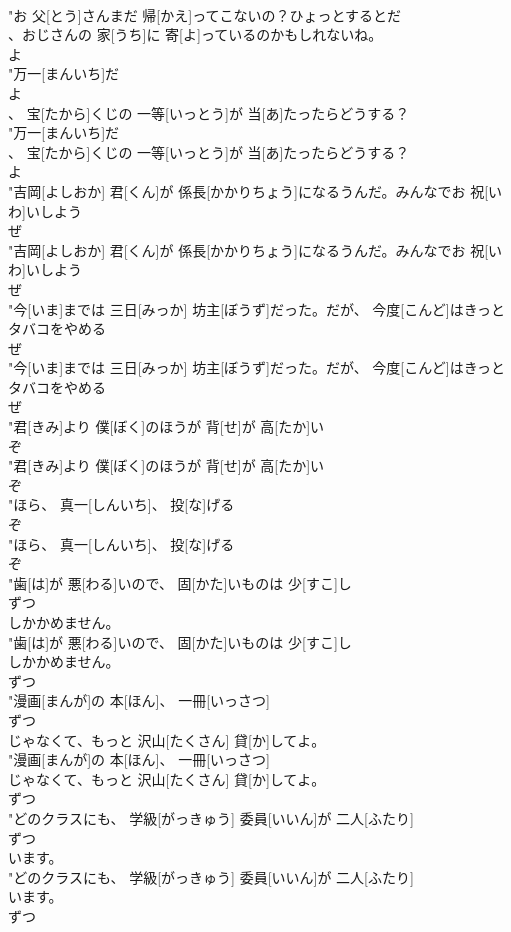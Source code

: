 \documentclass[8pt]{extreport}
\begin{document}
\begin{CJK}{UTF8}{min}
\\	"お 父[とう]さんまだ 帰[かえ]ってこないの？ひょっとするとだ
\\	、おじさんの 家[うち]に 寄[よ]っているのかもしれないね。
\\	よ
\\	"万一[まんいち]だ
\\	よ
\\	、 宝[たから]くじの 一等[いっとう]が 当[あ]たったらどうする？
\\	"万一[まんいち]だ
\\	、 宝[たから]くじの 一等[いっとう]が 当[あ]たったらどうする？
\\	よ
\\	"吉岡[よしおか] 君[くん]が 係長[かかりちょう]になるうんだ。みんなでお 祝[いわ]いしよう
\\	ぜ
\\	"吉岡[よしおか] 君[くん]が 係長[かかりちょう]になるうんだ。みんなでお 祝[いわ]いしよう
\\	ぜ
\\	"今[いま]までは 三日[みっか] 坊主[ぼうず]だった。だが、 今度[こんど]はきっとタバコをやめる
\\	ぜ
\\	"今[いま]までは 三日[みっか] 坊主[ぼうず]だった。だが、 今度[こんど]はきっとタバコをやめる
\\	ぜ
\\	"君[きみ]より 僕[ぼく]のほうが 背[せ]が 高[たか]い
\\	ぞ
\\	"君[きみ]より 僕[ぼく]のほうが 背[せ]が 高[たか]い
\\	ぞ
\\	"ほら、 真一[しんいち]、 投[な]げる
\\	ぞ
\\	"ほら、 真一[しんいち]、 投[な]げる
\\	ぞ
\\	"歯[は]が 悪[わる]いので、 固[かた]いものは 少[すこ]し
\\	ずつ
\\	しかかめません。
\\	"歯[は]が 悪[わる]いので、 固[かた]いものは 少[すこ]し
\\	しかかめません。
\\	ずつ
\\	"漫画[まんが]の 本[ほん]、 一冊[いっさつ]
\\	ずつ
\\	じゃなくて、もっと 沢山[たくさん] 貸[か]してよ。
\\	"漫画[まんが]の 本[ほん]、 一冊[いっさつ]
\\	じゃなくて、もっと 沢山[たくさん] 貸[か]してよ。
\\	ずつ
\\	"どのクラスにも、 学級[がっきゅう] 委員[いいん]が 二人[ふたり]
\\	ずつ
\\	います。
\\	"どのクラスにも、 学級[がっきゅう] 委員[いいん]が 二人[ふたり]
\\	います。
\\	ずつ
\end{CJK}
\end{document}
